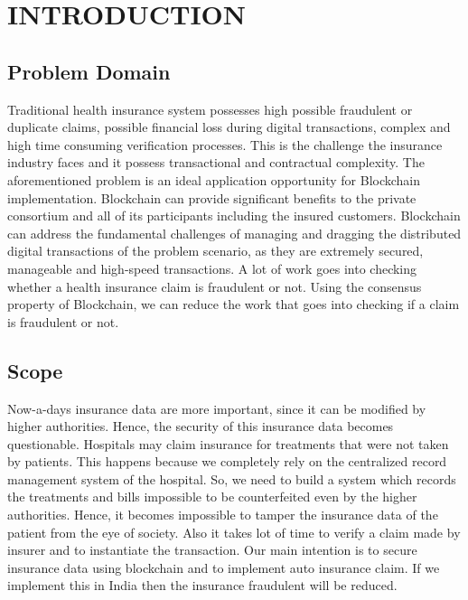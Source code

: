 
\chapter{INTRODUCTION} %
\section{Problem Domain} %
\lipsum[]
Traditional health insurance system possesses high possible fraudulent or duplicate claims, possible financial loss during digital transactions, complex and high time consuming verification processes. This is the challenge the insurance industry faces and it possess transactional and contractual complexity. The aforementioned problem is an ideal application opportunity for Blockchain implementation. Blockchain can provide significant benefits to the private consortium and all of its participants including the insured customers. Blockchain can address the fundamental challenges of managing and dragging the distributed digital transactions of the problem scenario, as they are extremely secured, manageable and high-speed transactions. A lot of work goes into checking whether a health insurance claim is fraudulent or not. Using the consensus property of Blockchain, we can reduce the work that goes into checking if a claim is fraudulent or not.

\section{Scope} %
\lipsum[]
Now-a-days insurance data are more important, since it can be
modified by higher authorities. Hence, the security of this insurance data becomes questionable. Hospitals may claim insurance for treatments that were not taken by patients. This happens because we completely rely on the centralized record management system of the hospital. So, we need to build a system which records the treatments and bills impossible to be counterfeited even by the higher authorities. Hence, it becomes impossible to tamper the insurance data of the patient from the eye of society. Also it takes lot of time to verify a claim made by insurer and to instantiate the transaction. Our main intention is to secure insurance data using blockchain and to implement auto insurance claim. If we implement this in India then the insurance fraudulent will be reduced. 
